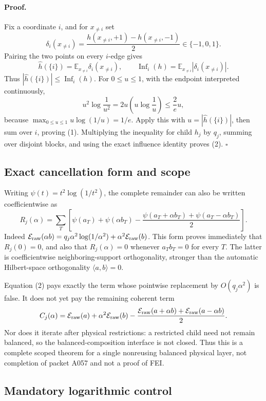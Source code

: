 \paragraph{Proof.}
Fix a coordinate \(i\), and for \(x_{\ne i}\) set
\[
 \delta_i(x_{\ne i})=
 \frac{h(x_{\ne i},+1)-h(x_{\ne i},-1)}2\in\{-1,0,1\}.
\]
Pairing the two points on every \(i\)-edge gives
\[
 \widehat h(\{i\})=\mathbb E_{x_{\ne i}}\delta_i(x_{\ne i}),
 \qquad
 \operatorname{Inf}_i(h)=\mathbb E_{x_{\ne i}}|\delta_i(x_{\ne i})|.
\]
Thus \(|\widehat h(\{i\})|\le\operatorname{Inf}_i(h)\).  For
\(0\le u\le1\), with the endpoint interpreted continuously,
\[
 u^2\log\frac1{u^2}=2u\left(u\log\frac1u\right)\le\frac2e u,
\]
because \(\max_{0\le u\le1}u\log(1/u)=1/e\).  Apply this with
\(u=|\widehat h(\{i\})|\), then sum over \(i\), proving (1).  Multiplying
the inequality for child \(h_j\) by \(q_j\), summing over disjoint blocks,
and using the exact influence identity proves (2). \(\square\)

\subsection*{Exact cancellation form and scope}

Writing \(\psi(t)=t^2\log(1/t^2)\), the complete remainder can also be
written coefficientwise as
\[
 R_j(\alpha)=\sum_T\left[
   \psi(a_T)+\psi(\alpha b_T)
   -\frac{\psi(a_T+\alpha b_T)+\psi(a_T-\alpha b_T)}2
 \right].
 \tag{3}
\]
Indeed
\(\mathcal E_{\rm raw}(\alpha b)=
q_j\alpha^2\log(1/\alpha^2)+\alpha^2\mathcal E_{\rm raw}(b)\).
This form proves immediately that \(R_j(0)=0\), and also that
\(R_j(\alpha)=0\) whenever \(a_Tb_T=0\) for every \(T\).  The latter is
coefficientwise neighboring-support orthogonality, stronger than the
automatic Hilbert-space orthogonality \(\langle a,b\rangle=0\).

Equation (2) pays exactly the term whose pointwise replacement by
\(O(q_j\alpha^2)\) is false.  It does not yet pay the remaining coherent
term
\[
 C_j(\alpha)=\mathcal E_{\rm raw}(a)+\alpha^2\mathcal E_{\rm raw}(b)
 -\frac{\mathcal E_{\rm raw}(a+\alpha b)
              +\mathcal E_{\rm raw}(a-\alpha b)}2.
\]
Nor does it iterate after physical restrictions: a restricted child need
not remain balanced, so the balanced-composition interface is not closed.
Thus this is a complete scoped theorem for a single nonreusing balanced
physical layer, not completion of packet A057 and not a proof of FEI.

\subsection*{Mandatory logarithmic control}

